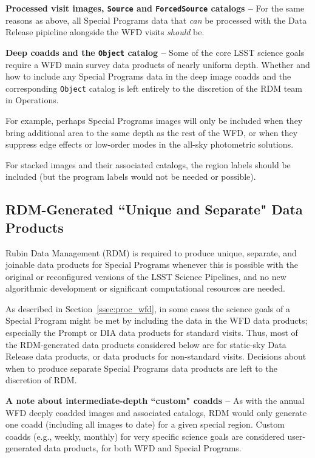 \textbf{Processed visit images, {\tt Source} and {\tt ForcedSource} catalogs -- }
For the same reasons as above, all Special Programs data that 
{\it can} be processed with the Data Release pipieline alongside the WFD 
visits {\it should} be.

\textbf{Deep coadds and the {\tt Object} catalog -- }
Some of the core LSST science goals require a WFD main survey data 
products of nearly uniform depth.
Whether and how to include any Special Programs data in the deep image 
coadds and the corresponding {\tt Object} catalog is left entirely to the 
discretion of the RDM team in Operations.

For example, perhaps Special Programs images will only be included when 
they bring additional area to the same depth as the rest of the WFD, or 
when they suppress edge effects or low-order modes in the 
all-sky photometric solutions.

For stacked images and their associated catalogs, the region labels should be
included (but the program labels would not be needed or possible).


\subsection{RDM-Generated ``Unique and Separate" Data Products}\label{ssec:proc_rdm}

Rubin Data Management (RDM) is required to produce unique, separate, and 
joinable data products for Special Programs whenever this is possible with the 
original or reconfigured versions of the LSST Science Pipelines, and no new 
algorithmic development or significant computational resources are needed.

As described in Section~\ref{ssec:proc_wfd}, in some cases the science goals 
of a Special Program might be met by including the data in the WFD data 
products; especially the Prompt or DIA data products for standard visits.
Thus, most of the RDM-generated data products considered below are for 
static-sky Data Release data products, or data products for non-standard visits.
Decisions about when to produce separate Special Programs data products are 
left to the discretion of RDM.

\textbf{A note about intermediate-depth ``custom" coadds -- }
As with the annual WFD deeply coadded images and associated catalogs, RDM would 
only generate one coadd (including all images to date) for a given special region.
Custom coadds (e.g., weekly, monthly) for very specific science goals are considered 
user-generated data products, for both WFD and Special Programs.

